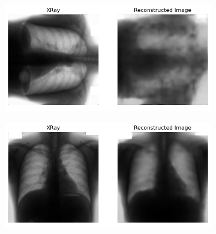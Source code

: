 \begin{figure}[htbp]
\begin{subfigure}{0.49\linewidth}
        \caption{ }
        \label{fig:unsup-orienation-down}
    \end{subfigure}
    \begin{subfigure}{0.49\linewidth}
        \centering
        \includegraphics[width=\linewidth]{../plots/unsupervised-orientation/result-left.png}
        \caption{ }
        \label{fig:unsup-orienation-left}
    \end{subfigure}
    \begin{subfigure}{0.49\linewidth}
        \centering
        \includegraphics[width=\linewidth]{../plots/unsupervised-orientation/result-trained-xrays.png}
        \caption{ }
        \label{fig:unsup-trained-image}
    \end{subfigure}
  \end{figure}


